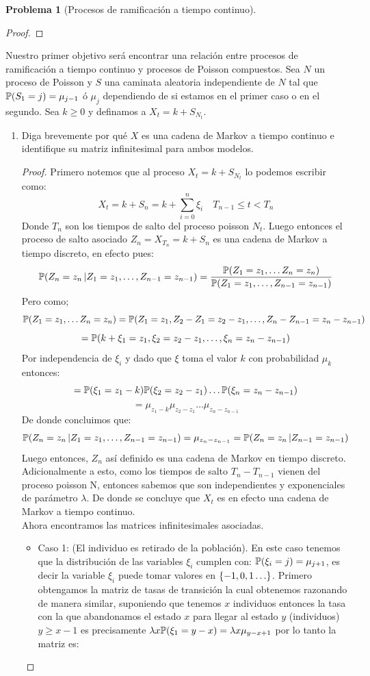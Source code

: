 \documentclass[a5paper,oneside]{amsart}
\theoremstyle{plain}
\theoremstyle{definition}
\newtheorem{problema}{Problema}
\begin{document}
\begin{problema}[Procesos de ramificaci\'on a tiempo continuo]
\begin{enumerate}
\begin{proof}
\end{proof}
\end{enumerate}
Nuestro primer objetivo ser\'a encontrar una relaci\'on entre procesos de ramificaci\'on a tiempo continuo y procesos de Poisson compuestos. Sea $N$ un proceso de Poisson  y $S$ una caminata aleatoria independiente de $N$ tal que $\mathbb{P}\! \left( S_1=j \right)=\mu_{j-1}$ \'o $\mu_{j}$ dependiendo de si estamos en el primer caso o en el segundo. Sea $k\geq 0$ y definamos a $X_t=k+S_{N_t}$.
\begin{enumerate}
\item Diga brevemente por qu\'e $X$ es una cadena de Markov a tiempo continuo e identifique su matriz infinitesimal para ambos modelos.
\begin{proof}
Primero notemos que al proceso $X_t=k+S_{N_t}$ lo podemos  escribir como:
$$
X_t=k+S_{n}=k+\sum_{i=0}^{n}\xi_i \quad T_{n-1}\leq t < T_{n}
$$
Donde $T_n$ son los tiempos de salto del proceso poisson $N_t$. Luego entonces el proceso de salto asociado $Z_n=X_{T_n}=k+S_n$ es una cadena de Markov a tiempo discreto, en efecto pues:
$$
\mathbb{P}\! \left( Z_n=z_n \, | Z_1=z_1,\ldots,Z_{n-1}=z_{n-1} \right)=\frac{ \mathbb{P} (Z_1=z_1,\ldots Z_n=z_n)}{ \mathbb{P} (Z_1=z_1,\ldots,Z_{n-1}=z_{n-1})}
$$
Pero como; 
$$
 \mathbb{P} (Z_1=z_1,\ldots Z_n=z_n)= \mathbb{P} (Z_1=z_1,Z_2-Z_1=z_2-z_1,\ldots,Z_n-Z_{n-1}=z_n-z_{n-1})
$$
$$
= \mathbb{P} (k+\xi_1=z_1,\xi_2=z_2-z_1,\ldots,\xi_n=z_n-z_{n-1})
$$
Por independencia de $\xi_i$ y dado que $\xi$ toma el valor $k$ con probabilidad $\mu_k$ entonces:
$$
= \mathbb{P} (\xi_1=z_1-k) \mathbb{P} (\xi_2=z_2-z_1)\ldots \mathbb{P} (\xi_n=z_n-z_{n-1})
$$
$$
=\mu_{z_1-k}\mu_{z_2-z_1}\ldots\mu_{z_n-z_{n-1}}
$$
De donde concluimos que:
$$
\mathbb{P}\! \left( Z_n=z_n \, | Z_1=z_1,\ldots,Z_{n-1}=z_{n-1} \right)=\mu_{z_n-z_{n-1}}=\mathbb{P}\! \left( Z_n=z_n \, | Z_{n-1}=z_{n-1} \right)
$$
Luego entonces, $Z_n$ as\'i definido es una cadena de Markov en tiempo discreto. Adicionalmente a esto, como los tiempos de salto $T_n-T_{n-1}$ vienen del proceso poisson N, entonces sabemos que son independientes  y exponenciales de par\'ametro $\lambda$. De donde se concluye que $X_t$ es en efecto una cadena de Markov a tiempo continuo.\\ Ahora encontramos las matrices infinitesimales asociadas.
\begin{itemize}
 \item Caso 1: (El individuo es retirado de la poblaci\'on). En este caso tenemos que la distribuci\'on de las variables $\xi_i$ cumplen con:  $ \mathbb{P} (\xi_i=j)=\mu_{j+1}$, es decir la variable $\xi_i$ puede tomar valores  en $\left\{ -1,0,1\ldots\right\} $. Primero obtengamos la matriz de tasas de transici\'on la cual obtenemos razonando de manera similar, suponiendo que tenemos $x$ individuos  entonces la tasa con la que abandonamos el estado $x$ para llegar al estado $y$  (individuos) $y \geq x-1$ es precisamente $\lambda x  \mathbb{P} (\xi_1=y-x)=\lambda x \mu_{y-x+1}$ por lo tanto la matriz es:

\end{itemize}
\end{proof}
\end{enumerate}
\end{problema}
\end{document}
